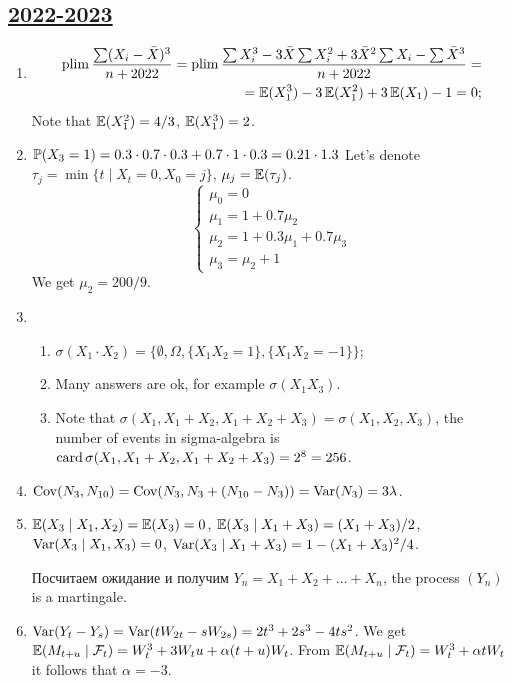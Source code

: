 \subsection[2022-2023]{\hyperref[sec:kr_01_2022_2023]{2022-2023}}
\label{sec:sol_kr_01_2022_2023} %

\begin{enumerate}
    \item 
    \begin{align*}
        \plim \frac{\sum (X_i - \bar X)^3}{n+2022} = \plim \frac{\sum X_i^3 - 3\bar X\sum X_i^2 +3\bar X^2 \sum X_i - \sum \bar X^3}{n+2022} = \\
        = \E(X_1^3) - 3\E(X_1^2) + 3\E(X_1) - 1 = 0;
    \end{align*}
    Note that $\E(X_1^2) = 4/3$, $\E(X_1^3) = 2$.
    \item $\P(X_3 = 1) = 0.3\cdot 0.7\cdot 0.3 + 0.7\cdot 1\cdot 0.3 = 0.21 \cdot 1.3$
    Let's denote $\tau_j = \min \{t \mid X_t = 0, X_0 = j\}$, $\mu_j = \E(\tau_j)$.
    \[
    \begin{cases}
        \mu_0 = 0 \\
        \mu_1 = 1 + 0.7\mu_2 \\
        \mu_2 = 1 + 0.3\mu_1 + 0.7\mu_3 \\
        \mu_3 = \mu_2 + 1 
    \end{cases}    
    \]
    We get $\mu_2 = 200/9$.
    \item \begin{enumerate}
        \item $\sigma(X_1 \cdot X_2) = \{\emptyset, \Omega, \{X_1 X_2 = 1\}, \{X_1 X_2 = -1\}\}$;
        \item Many answers are ok, for example $\sigma(X_1 X_3)$.
        \item Note that $\sigma(X_1, X_1 + X_2, X_1+ X_2+X_3) = \sigma(X_1, X_2, X_3)$, the number of events in sigma-algebra is
        $\card \sigma(X_1, X_1 + X_2, X_1+ X_2+X_3) = 2^8 = 256$.
    \end{enumerate}
    \item $\Cov(N_3, N_{10}) = \Cov(N_3, N_3 + (N_{10} - N_3)) = \Var(N_3) = 3\lambda$.
    \item $\E(X_3 \mid X_1, X_2) = \E(X_3) = 0$, $\E(X_3 \mid X_1 + X_3) = (X_1 + X_3) / 2$, $\Var(X_3 \mid X_1, X_3) = 0$,
    $\Var(X_3 \mid X_1 + X_3) = 1 - (X_1 + X_3)^2/4$.
    
    Посчитаем ожидание и получим $Y_n = X_1 + X_2 + \ldots + X_n$, the process $(Y_n)$ is a martingale.
    \item $\Var(Y_t - Y_s) = \Var(tW_{2t} - sW_{2s}) = 2t^3 + 2s^3 - 4ts^2$.
    We get $\E(M_{t+u} \mid \mathcal F_t ) = W_t^3 + 3W_t u  + \alpha(t + u) W_t$.
    From $\E(M_{t+u} \mid \mathcal F_t ) = W_t^3 + \alpha t W_t$ it follows that $\alpha = -3$.
\end{enumerate}


